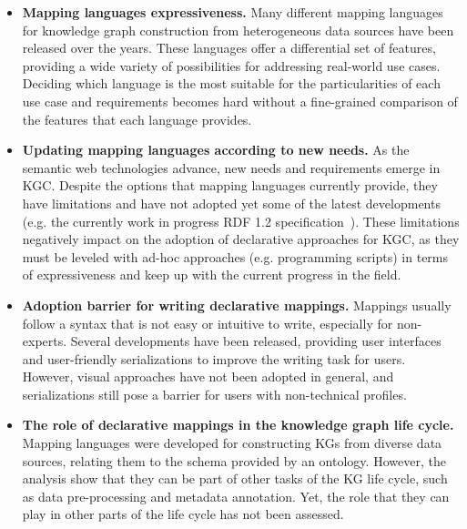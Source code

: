 \begin{itemize}
    \item \textbf{Mapping languages expressiveness.} Many different mapping languages for knowledge graph construction from heterogeneous data sources have been released over the years. These languages offer a differential set of features, providing a wide variety of possibilities for addressing real-world use cases. Deciding which language is the most suitable for the particularities of each use case and requirements becomes hard without a fine-grained comparison of the features that each language provides. 
    
    \item \textbf{Updating mapping languages according to new needs.} As the semantic web technologies advance, new needs and requirements emerge in KGC. Despite the options that mapping languages currently provide, they have limitations and have not adopted yet some of the latest developments (e.g. the currently work in progress RDF 1.2 specification~\parencite{hartig2023rdf}). These limitations negatively impact on the adoption of declarative approaches for KGC, as they must be leveled with ad-hoc approaches (e.g. programming scripts) in terms of expressiveness and keep up with the current progress in the field.
    
    \item \textbf{Adoption barrier for writing declarative mappings.} Mappings usually follow a syntax that is not easy or intuitive to write, especially for non-experts. Several developments have been released, providing user interfaces and user-friendly serializations to improve the writing task for users. However, visual approaches have not been adopted in general, and serializations still pose a barrier for users with non-technical profiles. 

    
    \item \textbf{The role of declarative mappings in the knowledge graph life cycle.} Mapping languages were developed for constructing KGs from diverse data sources, relating them to the schema provided by an ontology. However, the analysis show that they can be part of other tasks of the KG life cycle, such as data pre-processing and metadata annotation. Yet, the role that they can play in other parts of the life cycle has not been assessed. 
\end{itemize}
